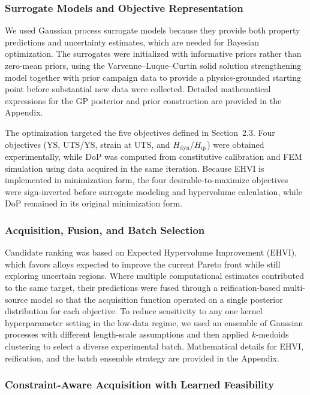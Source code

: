 \subsubsection{Surrogate Models and Objective Representation}

We used Gaussian process surrogate models because they provide both property predictions and uncertainty estimates, which are needed for Bayesian optimization. The surrogates were initialized with informative priors rather than zero-mean priors, using the Varvenne--Luque--Curtin solid solution strengthening model together with prior campaign data to provide a physics-grounded starting point before substantial new data were collected. Detailed mathematical expressions for the GP posterior and prior construction are provided in the Appendix.

The optimization targeted the five objectives defined in Section~2.3. Four objectives (YS, UTS/YS, strain at UTS, and $H_\text{dyn}/H_\text{qs}$) were obtained experimentally, while DoP was computed from constitutive calibration and FEM simulation using data acquired in the same iteration. Because EHVI is implemented in minimization form, the four desirable-to-maximize objectives were sign-inverted before surrogate modeling and hypervolume calculation, while DoP remained in its original minimization form.

\subsubsection{Acquisition, Fusion, and Batch Selection}

Candidate ranking was based on Expected Hypervolume Improvement (EHVI), which favors alloys expected to improve the current Pareto front while still exploring uncertain regions. Where multiple computational estimates contributed to the same target, their predictions were fused through a reification-based multi-source model so that the acquisition function operated on a single posterior distribution for each objective. To reduce sensitivity to any one kernel hyperparameter setting in the low-data regime, we used an ensemble of Gaussian processes with different length-scale assumptions and then applied $k$-medoids clustering to select a diverse experimental batch. Mathematical details for EHVI, reification, and the batch ensemble strategy are provided in the Appendix.

\subsubsection{Constraint-Aware Acquisition with Learned Feasibility}

